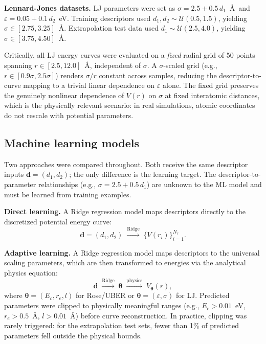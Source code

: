 \documentclass[aps,prb,twocolumn,superscriptaddress,longbibliography,floatfix]{revtex4-2}
\begin{document}
\textbf{Lennard-Jones datasets.} LJ parameters were set as $\sigma = 2.5 + 0.5\, d_1$~\AA\ and $\varepsilon = 0.05 + 0.1\, d_2$~eV. Training descriptors used $d_1, d_2 \sim \mathcal{U}(0.5, 1.5)$, yielding $\sigma \in [2.75, 3.25]$~\AA. Extrapolation test data used $d_1 \sim \mathcal{U}(2.5, 4.0)$, yielding $\sigma \in [3.75, 4.50]$~\AA.

Critically, all LJ energy curves were evaluated on a \emph{fixed} radial grid of 50 points spanning $r \in [2.5, 12.0]$~\AA, independent of $\sigma$. A $\sigma$-scaled grid (e.g., $r \in [0.9\sigma, 2.5\sigma]$) renders $\sigma/r$ constant across samples, reducing the descriptor-to-curve mapping to a trivial linear dependence on $\varepsilon$ alone. The fixed grid preserves the genuinely nonlinear dependence of $V(r)$ on $\sigma$ at fixed interatomic distances, which is the physically relevant scenario: in real simulations, atomic coordinates do not rescale with potential parameters.

\subsection{Machine learning models}
\label{sec:ml_models}

Two approaches were compared throughout. Both receive the same descriptor inputs $\mathbf{d} = (d_1, d_2)$; the only difference is the learning target. The descriptor-to-parameter relationships (e.g., $\sigma = 2.5 + 0.5\, d_1$) are unknown to the ML model and must be learned from training examples.

\textbf{Direct learning.} A Ridge regression model maps descriptors directly to the discretized potential energy curve:
\begin{equation}
  \mathbf{d} = (d_1, d_2) \;\xrightarrow{\text{Ridge}}\; \{V(r_i)\}_{i=1}^{N_r}.
  \label{eq:direct}
\end{equation}

\textbf{Adaptive learning.} A Ridge regression model maps descriptors to the universal scaling parameters, which are then transformed to energies via the analytical physics equation:
\begin{equation}
  \mathbf{d} \;\xrightarrow{\text{Ridge}}\; \boldsymbol{\theta} \;\xrightarrow{\text{physics}}\; V_{\boldsymbol{\theta}}(r),
  \label{eq:adaptive}
\end{equation}
where $\boldsymbol{\theta} = (E_c, r_e, l)$ for Rose/UBER or $\boldsymbol{\theta} = (\varepsilon, \sigma)$ for LJ. Predicted parameters were clipped to physically meaningful ranges (e.g., $E_c > 0.01$~eV, $r_e > 0.5$~\AA, $l > 0.01$~\AA) before curve reconstruction. In practice, clipping was rarely triggered: for the extrapolation test sets, fewer than 1\% of predicted parameters fell outside the physical bounds.
\end{document}
